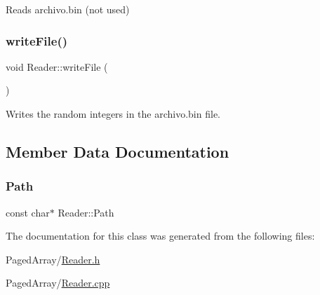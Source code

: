 Reads archivo.\+bin (not used) 

\mbox{\label{classReader_ab6cd23c1911a1b7dfb452659fef4a6d4}} 
\subsubsection{\texorpdfstring{write\+File()}{writeFile()}}
{\footnotesize\ttfamily void Reader\+::write\+File (\begin{DoxyParamCaption}{ }\end{DoxyParamCaption})}



Writes the random integers in the archivo.\+bin file. 



\subsection{Member Data Documentation}
\mbox{\label{classReader_ab5f068fab65032809f1bbd13c9ff6cc4}} 
\subsubsection{\texorpdfstring{Path}{Path}}
{\footnotesize\ttfamily const char$\ast$ Reader\+::\+Path\hspace{0.3cm}{\ttfamily [private]}}



The documentation for this class was generated from the following files\+:\begin{DoxyCompactItemize}
\item 
Paged\+Array/\mbox{\hyperlink{Reader_8h}{Reader.\+h}}\item 
Paged\+Array/\mbox{\hyperlink{Reader_8cpp}{Reader.\+cpp}}\end{DoxyCompactItemize}
